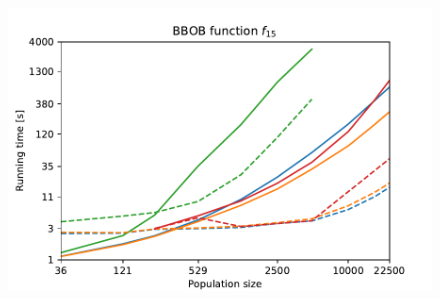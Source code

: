\begin{figure}[ht!]
\begin{minipage}[t]{0.32\textwidth}
        \includegraphics[width=\textwidth]{img/runs/time_pso2006_fn15_neigh.pdf}
    \end{minipage}


\end{figure}
